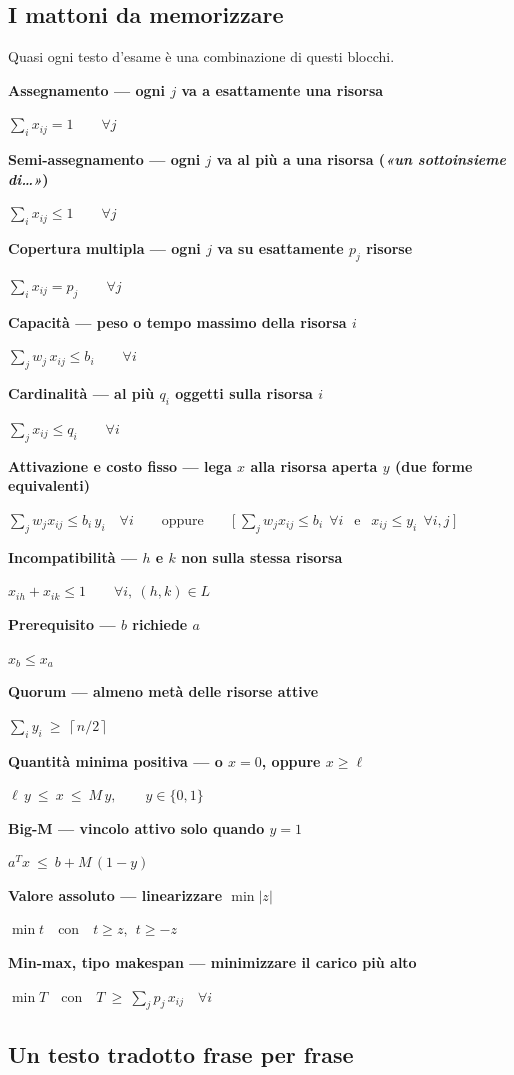 \documentclass[11pt,a4paper]{article}
\newcommand{\mattone}[2]{%
\par\vspace{0.5em}\textbf{#1}\par\vspace{-0.4em}
\begin{center}$\displaystyle #2$\end{center}\vspace{-0.2em}}
\begin{document}
\subsection{I mattoni da memorizzare}

Quasi ogni testo d'esame è una combinazione di questi blocchi.

\mattone{Assegnamento --- ogni $j$ va a esattamente una risorsa}
{\sum_{i} x_{ij} = 1 \qquad \forall j}

\mattone{Semi-assegnamento --- ogni $j$ va al più a una risorsa (\emph{«un sottoinsieme di\dots»})}
{\sum_{i} x_{ij} \le 1 \qquad \forall j}

\mattone{Copertura multipla --- ogni $j$ va su esattamente $p_j$ risorse}
{\sum_{i} x_{ij} = p_j \qquad \forall j}

\mattone{Capacità --- peso o tempo massimo della risorsa $i$}
{\sum_{j} w_j\, x_{ij} \le b_i \qquad \forall i}

\mattone{Cardinalità --- al più $q_i$ oggetti sulla risorsa $i$}
{\sum_{j} x_{ij} \le q_i \qquad \forall i}

\mattone{Attivazione e costo fisso --- lega $x$ alla risorsa aperta $y$ (due forme equivalenti)}
{\sum_{j} w_j x_{ij} \le b_i\, y_i \quad \forall i
 \qquad\text{oppure}\qquad
 \Big[\ \sum_{j} w_j x_{ij} \le b_i \ \ \forall i \ \ \text{ e } \ \ x_{ij} \le y_i \ \ \forall i,j\ \Big]}

\mattone{Incompatibilità --- $h$ e $k$ non sulla stessa risorsa}
{x_{ih} + x_{ik} \le 1 \qquad \forall i, \ (h,k) \in L}

\mattone{Prerequisito --- $b$ richiede $a$}
{x_b \le x_a}

\mattone{Quorum --- almeno metà delle risorse attive}
{\sum_{i} y_i \ \ge\ \left\lceil n/2 \right\rceil}

\mattone{Quantità minima positiva --- o $x = 0$, oppure $x \ge \ell$}
{\ell\, y \ \le\ x \ \le\ M\, y, \qquad y \in \{0,1\}}

\mattone{Big-M --- vincolo attivo solo quando $y = 1$}
{a^T x \ \le\ b + M\,(1 - y)}

\mattone{Valore assoluto --- linearizzare $\min |z|$}
{\min t \quad\text{con}\quad t \ge z, \ \ t \ge -z}

\mattone{Min-max, tipo makespan --- minimizzare il carico più alto}
{\min T \quad\text{con}\quad T \ \ge\ \sum_{j} p_j\, x_{ij} \quad \forall i}

\newpage
\subsection{Un testo tradotto frase per frase}
\end{document}
